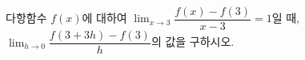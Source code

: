 다항함수 $f(x)$에 대하여 $\displaystyle\lim_{x\to 3}\dfrac{f(x)-f(3)}{x-3}=1$일 때, $\displaystyle\lim_{h\to 0}\dfrac{f(3+3h)-f(3)}{h}$의 값을 구하시오.
